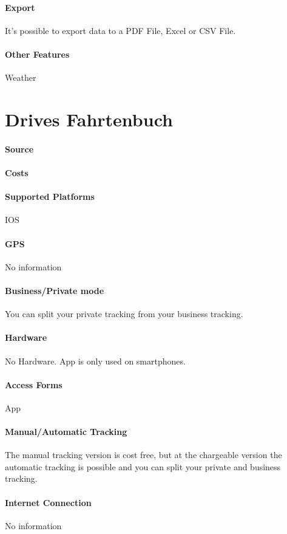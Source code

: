 \paragraph{Export} It’s possible to export data to a PDF File, Excel or CSV File.
\paragraph{Other Features} Weather
\newpage
\section{Drives Fahrtenbuch}
\paragraph{Source} 
\paragraph{Costs} 
\paragraph{Supported Platforms} IOS
\paragraph{GPS} No information
\paragraph{Business/Private mode} You can split your private tracking from your business tracking.
\paragraph{Hardware} No Hardware. App is only used on smartphones.
\paragraph{Access Forms} App
\paragraph{Manual/Automatic Tracking} The manual tracking version is cost free, but at the chargeable version the automatic tracking is possible and you can split your private and business tracking.
\paragraph{Internet Connection} No information

